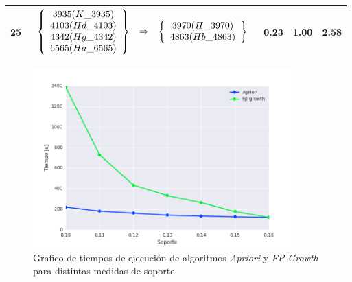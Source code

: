 \begin{longtable}{| c | l | c | c | c |}
25 & $\begin{array}{c c c}\left\{\begin{array}{c}3935 (K\_3935) \\ 4103 (Hd\_4103) \\ 4342 (Hg\_4342) \\ 6565 (Ha\_6565)\end{array}\right\} & \Rightarrow & \left\{\begin{array}{c}3970 (H\_3970) \\ 4863 (Hb\_4863)\end{array}\right\}\end{array}$ & 0.23 & 1.00 & 2.58 \\ \hline
\end{longtable}

\begin{figure}[h!]
\begin{center}
\includegraphics[width=0.9\textwidth]{imagenes/complexity_support.png}
\end{center}
\vspace*{-5mm}
\caption{Grafico de tiempos de ejecución de algoritmos \textit{Apriori} y \textit{FP-Growth} para distintas medidas de soporte}
\label{fig:complexity_support}
\end{figure}
